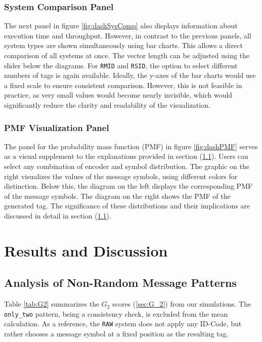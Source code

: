\documentclass[english,BCOR=4mm,cdfont=false]{tudscrreprt} %
\begin{document}
\subsection{System Comparison Panel}
The next panel in figure \ref{fig:dashSysComp} also displays information about execution time and throughput. However, in contrast to the previous panels, all system types are shown simultaneously using bar charts. This allows a direct comparison of all systems at once. The vector length can be adjusted using the slider below the diagrams. For \texttt{RMID} and \texttt{RSID}, the option to select different numbers of tags is again available. Ideally, the y-axes of the bar charts would use a fixed scale to ensure consistent comparison. However, this is not feasible in practice, as very small values would become nearly invisible, which would significantly reduce the clarity and readability of the visualization.

\subsection{PMF Visualization Panel}
The panel for the probability mass function (PMF) in figure \ref{fig:dashPMF} serves as a visual supplement to the explanations provided in section (\ref{sec:mesPat}). Users can select any combination of encoder and symbol distribution. The graphic on the right visualizes the values of the message symbols, using different colors for distinction. Below this, the diagram on the left displays the corresponding PMF of the message symbols. The diagram on the right shows the PMF of the generated tag. The significance of these distributions and their implications are discussed in detail in section (\ref{sec:mesPat}).


\chapter{Results and Discussion}
\label{chap:evalInter}

\section{Analysis of Non-Random Message Patterns}
\label{sec:mesPat}
Table \ref{tab:G2} summarizes the $G_2$ scores (\ref{sec:G_2}) from our simulations. The \texttt{only\_two} pattern, being a consistency check, is excluded from the mean calculation. As a reference, the \texttt{RAW} system does not apply any ID-Code, but rather chooses a message symbol at a fixed position as the resulting tag.
\end{document}
